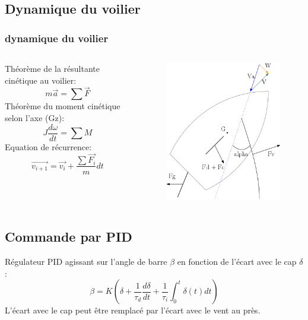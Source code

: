 \documentclass{beamer}
\begin{document}
\subsection{Dynamique du voilier}

\begin{frame}\frametitle{dynamique du voilier}
\begin{columns}
\begin{column}{5cm}
Théorème de la résultante cinétique au voilier:
\[ m \vec{a} = \sum \vec{F} \]
Théorème du moment cinétique selon l'axe (Gz):
\[ J \frac{d \omega}{dt} = \sum M \]
Equation de récurrence:
\[ \vec{v_{i+1}} = \vec{v_{i}} + \frac{\sum \vec{F_{i}}}{m}dt \]
\end{column}
\begin{column}{5cm}
\begin{figure}
\includegraphics[scale=0.4]{trc.png} 
\end{figure}
\end{column}
\end{columns}
\end{frame}

\subsection{Commande par PID}

\begin{frame}
Régulateur PID agissant sur l'angle de barre $\beta$ en fonction de l'écart avec le cap $\delta$ :
\[ \beta = K( \delta + \frac{1}{\tau_{d}} \frac{d \delta}{dt} + \frac{1}{\tau_{i}} \int_{0}^{t} \delta (t)dt ) \]
L'écart avec le cap peut être remplacé par l'écart avec le vent au près.
\end{frame}
\end{document}
